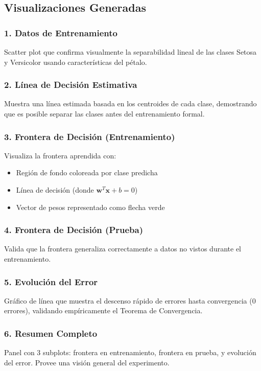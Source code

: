 \documentclass[12pt]{src/formato_utem}
\begin{document}
\subsection{Visualizaciones Generadas}

\subsubsection{1. Datos de Entrenamiento}
Scatter plot que confirma visualmente la separabilidad lineal de las clases Setosa y Versicolor usando características del pétalo.

\subsubsection{2. Línea de Decisión Estimativa}
Muestra una línea estimada basada en los centroides de cada clase, demostrando que es posible separar las clases antes del entrenamiento formal.

\subsubsection{3. Frontera de Decisión (Entrenamiento)}
Visualiza la frontera aprendida con:
\begin{itemize}
    \item Región de fondo coloreada por clase predicha
    \item Línea de decisión (donde $\mathbf{w}^T \mathbf{x} + b = 0$)
    \item Vector de pesos representado como flecha verde
\end{itemize}

\subsubsection{4. Frontera de Decisión (Prueba)}
Valida que la frontera generaliza correctamente a datos no vistos durante el entrenamiento.

\subsubsection{5. Evolución del Error}
Gráfico de línea que muestra el descenso rápido de errores hasta convergencia (0 errores), validando empíricamente el Teorema de Convergencia.

\subsubsection{6. Resumen Completo}
Panel con 3 subplots: frontera en entrenamiento, frontera en prueba, y evolución del error. Provee una visión general del experimento.
\end{document}
